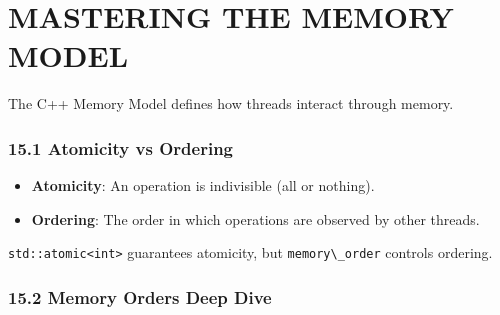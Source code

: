 \hypertarget{mastering-the-memory-model}{%
\chapter{MASTERING THE MEMORY MODEL}\label{mastering-the-memory-model}}

The C++ Memory Model defines how threads interact through memory.

\hypertarget{atomicity-vs-ordering}{%
\subsection{15.1 Atomicity vs Ordering}\label{atomicity-vs-ordering}}

\begin{itemize}
\tightlist
\item
  \textbf{Atomicity}: An operation is indivisible (all or nothing).
\item
  \textbf{Ordering}: The order in which operations are observed by other
  threads.
\end{itemize}

\passthrough{\lstinline!std::atomic<int>!} guarantees atomicity, but
\passthrough{\lstinline!memory\_order!} controls ordering.

\hypertarget{memory-orders-deep-dive}{%
\subsection{15.2 Memory Orders Deep
Dive}\label{memory-orders-deep-dive}}

